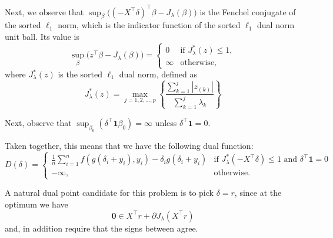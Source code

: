 \documentclass[article]{jss}
\begin{document}
\begin{appendix}
  Next, we observe that \(\sup_\beta \big((-X^\intercal
  \delta)^\intercal \beta -  J_\lambda(\beta) \big)\) is the Fenchel conjugate of
  the sorted \(\ell_1\) norm, which is the indicator function of the sorted
  \(\ell_1\) dual norm unit ball. Its value is
  \[
    \sup_\beta \big(z^\intercal \beta -  J_\lambda(\beta) \big) =
    \begin{cases}
      0      & \text{if } J^*_\lambda(z) \leq 1, \\
      \infty & \text{otherwise},
    \end{cases}
  \]
  where \(J^*_\lambda(z)\) is the sorted \(\ell_1\) dual norm, defined as~\citep{negrinho2014}
  \begin{equation}
    J^*_\lambda(z) = \max_{j=1,2,\dots,p}\left\{ \frac{\sum_{k=1}^j|z_{(k)}|}{\sum_{k=1}^j\lambda_k}\right\}
  \end{equation}

  Next, observe that \(\sup_{\beta_0} (\delta^\intercal \bm{1} \beta_0) = \infty\) unless
  \(\delta^\intercal \bm{1} = 0\).

  Taken together, this means that we have the following dual function:
  \begin{equation}
    D(\delta) = \begin{cases}
      \frac{1}{n} \sum_{i=1}^n f\left(g(\delta_i+y_i), y_i\right) - \delta_i g(\delta_i+ y_i) & \text{if } J^*_\lambda(-X^\intercal \delta) \leq 1 \text{ and } \delta^\intercal \bm{1} = 0 \\
      -\infty,                                                                                & \text{otherwise}.
    \end{cases}
  \end{equation}

  A natural dual point candidate for this problem is to pick
  \(\delta = r\), since
  at the optimum we have
  \[
    \bm{0} \in X^\intercal r + \partial J_\lambda(X^\intercal r)
  \]
  and, in addition require that the signs between agree.



\end{appendix}
\end{document}

